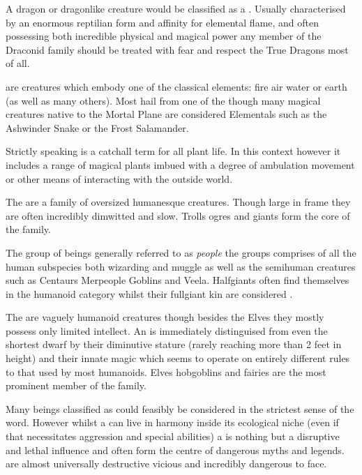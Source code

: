 {
	A dragon or dragon\minus{}like creature would be classified as a . Usually characterised by an enormous reptilian form and affinity for elemental flame, and often possessing both incredible physical and magical power\comma{} any member of the Draconid family should be treated with fear and respect\comma{} the True Dragons most of all.
}

{
	 are creatures which embody one of the classical elements: fire\comma{} air\comma{} water\comma{} or earth (as well as many others). Most hail from one of the \comma{} though many magical creatures native to the Mortal Plane are considered Elementals\comma{} such as the Ashwinder Snake\comma{} or the Frost Salamander.
}

{
	Strictly speaking\comma{}  is a catchall term for all plant life. In this context\comma{} however\comma{} it includes a range of magical plants\comma{} imbued with a degree of ambulation\comma{} movement or other means of interacting with the outside world.
}

{
	The  are a family of oversized human\minus{}esque creatures. Though large in frame\comma{} they are often incredibly dim\minus{}witted and slow. Trolls\comma{} ogres and giants form the core of the  family.
}

{
	The group of beings generally referred to as {\it people}\comma{} the  groups comprises of all the human subspecies \minus{} both wizarding and muggle \minus{} as well as the semi\minus{}human creatures such as Centaurs\comma{} Merpeople\comma{} Goblins and Veela. Half\minus{}giants often find themselves in the humanoid category\comma{} whilst their full\minus{}giant kin are considered .
}

{
	The  are vaguely humanoid creatures\comma{} though besides the Elves\comma{} they mostly possess only limited intellect. An  is immediately distinguised from even the shortest dwarf by their diminutive stature (rarely reaching more than 2 feet in height)\comma{} and their innate magic which seems to operate on entirely different rules to that used by most humanoids. Elves\comma{} hobgoblins and fairies are the most prominent member of the  family.
}

{
	Many beings classified as  could feasibly be considered \comma{} in the strictest sense of the word. However\comma{} whilst a  can live in harmony inside its ecological niche (even if that necessitates aggression and special abilities)\comma{} a  is nothing but a disruptive and lethal influence\comma{} and often form the centre of dangerous myths and legends.  are almost universally destructive\comma{} vicious and incredibly dangerous to face.
}

